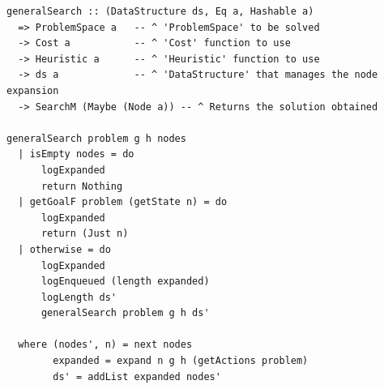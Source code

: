\begin{lstlisting}[style=haskell,
caption=Monadic \texttt{generalSearch} implementation, label=monad:general]
generalSearch :: (DataStructure ds, Eq a, Hashable a)
  => ProblemSpace a   -- ^ 'ProblemSpace' to be solved
  -> Cost a           -- ^ 'Cost' function to use
  -> Heuristic a      -- ^ 'Heuristic' function to use
  -> ds a             -- ^ 'DataStructure' that manages the node expansion
  -> SearchM (Maybe (Node a)) -- ^ Returns the solution obtained

generalSearch problem g h nodes
  | isEmpty nodes = do
      logExpanded
      return Nothing
  | getGoalF problem (getState n) = do
      logExpanded
      return (Just n)
  | otherwise = do 
      logExpanded
      logEnqueued (length expanded)
      logLength ds'
      generalSearch problem g h ds'

  where (nodes', n) = next nodes
        expanded = expand n g h (getActions problem)
        ds' = addList expanded nodes'
\end{lstlisting}


\newpage

